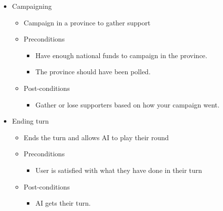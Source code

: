 \documentclass{article}
\begin{document}
	\begin{itemize}
   		\item  Campaigning
			\begin{itemize}
				\item Campaign in a province to gather support
				\item Preconditions
				\begin{itemize}
					\item Have enough national funds to campaign in the province.
					\item The province should have been polled.
				\end{itemize}
				\item Post-conditions
				\begin{itemize}
					\item Gather or lose supporters based on how your campaign went.
				\end{itemize}
			\end{itemize}
	\end{itemize}
	
	\begin{itemize}
   		\item  Ending turn
			\begin{itemize}
				\item Ends the turn and allows AI to play their round
				\item Preconditions
				\begin{itemize}
					\item User is satisfied with what they have done in their turn
				\end{itemize}
				\item Post-conditions
				\begin{itemize}
					\item AI gets their turn.
				\end{itemize}
			\end{itemize}
	\end{itemize}
	
\end{document}
